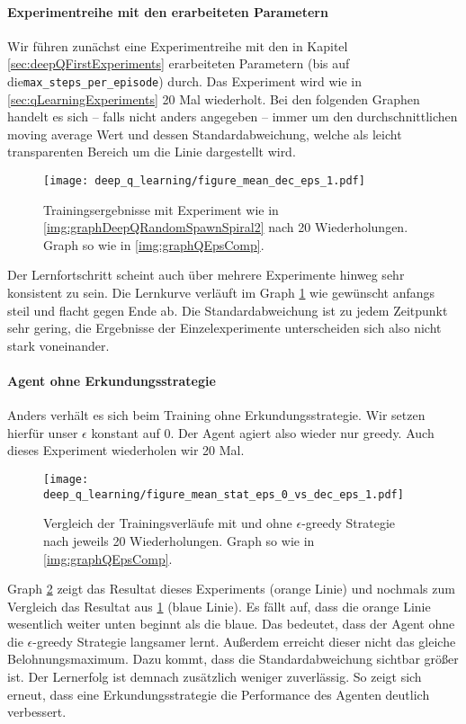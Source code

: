 \paragraph{Experimentreihe mit den erarbeiteten Parametern}
Wir führen zunächst eine Experimentreihe mit den in Kapitel \ref{sec:deepQFirstExperiments} erarbeiteten Parametern (bis auf die\linebreak\texttt{max_steps_per_episode}) durch. Das Experiment wird wie in \ref{sec:qLearningExperiments} 20 Mal wiederholt. Bei den folgenden Graphen handelt es sich -- falls nicht anders angegeben -- immer um den durchschnittlichen moving average Wert und dessen Standardabweichung, welche als leicht transparenten Bereich um die Linie dargestellt wird.
\begin{figure}[h!]
    \centering
    \texttt{[image: deep\_q\_learning/figure\_mean\_dec\_eps\_1.pdf]}
    \caption{Trainingsergebnisse mit Experiment wie in \ref{img:graphDeepQRandomSpawnSpiral2} nach 20 Wiederholungen. Graph so wie in \ref{img:graphQEpsComp}.} \label{img:graphDeepQMeanDecEps1}

\end{figure}
Der Lernfortschritt scheint auch über mehrere Experimente hinweg sehr konsistent zu sein. Die Lernkurve verläuft im Graph \ref{img:graphDeepQMeanDecEps1} wie gewünscht anfangs steil und flacht gegen Ende ab. Die Standardabweichung ist zu jedem Zeitpunkt sehr gering, die Ergebnisse der Einzelexperimente unterscheiden sich also nicht stark voneinander. 

\paragraph{Agent ohne Erkundungsstrategie}
Anders verhält es sich beim Training ohne Erkundungsstrategie. Wir setzen hierfür unser $ \epsilon $ konstant auf 0. Der Agent agiert also wieder nur greedy. Auch dieses Experiment wiederholen wir 20 Mal.
\begin{figure}[h!]
    \centering
    \texttt{[image: deep\_q\_learning/figure\_mean\_stat\_eps\_0\_vs\_dec\_eps\_1.pdf]}
    \caption{Vergleich der Trainingsverläufe mit und ohne $ \epsilon $-greedy Strategie nach jeweils 20 Wiederholungen. Graph so wie in \ref{img:graphQEpsComp}.} \label{img:graphDeepQMeanStatEps0VsDecEps1}
\end{figure}
Graph \ref{img:graphDeepQMeanStatEps0VsDecEps1} zeigt das Resultat dieses Experiments (orange Linie) und nochmals zum Vergleich das Resultat aus \ref{img:graphDeepQMeanDecEps1} (blaue Linie). Es fällt auf, dass die orange Linie wesentlich weiter unten beginnt als die blaue. Das bedeutet, dass der Agent ohne die $ \epsilon $-greedy Strategie langsamer lernt. Außerdem erreicht dieser nicht das gleiche Belohnungsmaximum. Dazu kommt, dass die Standardabweichung sichtbar größer ist. Der Lernerfolg ist demnach zusätzlich weniger zuverlässig. So zeigt sich erneut, dass eine Erkundungsstrategie die Performance des Agenten deutlich verbessert.

